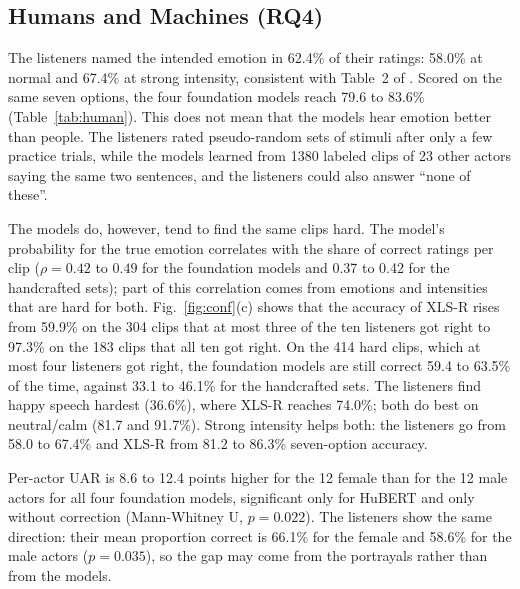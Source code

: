 \documentclass[journal]{IEEEtran}
\begin{document}


\subsection{Humans and Machines (RQ4)}
The listeners named the intended emotion in 62.4\% of their ratings: 58.0\% at normal and 67.4\% at strong intensity, consistent with Table~2 of \cite{livingstone2018ravdess}. Scored on the same seven options, the four foundation models reach 79.6 to 83.6\% (Table~\ref{tab:human}). This does not mean that the models hear emotion better than people. The listeners rated pseudo-random sets of stimuli after only a few practice trials, while the models learned from 1380 labeled clips of 23 other actors saying the same two sentences, and the listeners could also answer ``none of these''.

The models do, however, tend to find the same clips hard. The model's probability for the true emotion correlates with the share of correct ratings per clip ($\rho = 0.42$ to $0.49$ for the foundation models and 0.37 to 0.42 for the handcrafted sets); part of this correlation comes from emotions and intensities that are hard for both. Fig.~\ref{fig:conf}(c) shows that the accuracy of XLS-R rises from 59.9\% on the 304 clips that at most three of the ten listeners got right to 97.3\% on the 183 clips that all ten got right. On the 414 hard clips, which at most four listeners got right, the foundation models are still correct 59.4 to 63.5\% of the time, against 33.1 to 46.1\% for the handcrafted sets. The listeners find happy speech hardest (36.6\%), where XLS-R reaches 74.0\%; both do best on neutral/calm (81.7 and 91.7\%). Strong intensity helps both: the listeners go from 58.0 to 67.4\% and XLS-R from 81.2 to 86.3\% seven-option accuracy.

Per-actor UAR is 8.6 to 12.4 points higher for the 12 female than for the 12 male actors for all four foundation models, significant only for HuBERT and only without correction (Mann-Whitney U, $p = 0.022$). The listeners show the same direction: their mean proportion correct is 66.1\% for the female and 58.6\% for the male actors ($p = 0.035$), so the gap may come from the portrayals rather than from the models.
\end{document}
